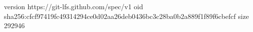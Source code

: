 version https://git-lfs.github.com/spec/v1
oid sha256:cfcf97419fc49314294ce0d02aa26deb0436bc3c28ba0b2a889f1f89f6cbefcf
size 292946
